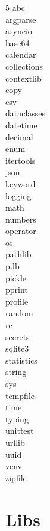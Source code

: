\documentclass [8pt] {extarticle}
\begin{document}
    \begin {multicols} {5}
    abc \\
    argparse \\
    asyncio \\
    base64 \\
    calendar \\
    collections \\
    contextlib \\
    copy \\
    csv \\
    dataclasses \\
    datetime \\
    decimal \\
    enum \\
    itertools \\
    json \\
    keyword \\
    logging \\
    math \\
    numbers \\
    operator \\
    os \\
    pathlib \\
    pdb \\
    pickle \\
    pprint \\
    profile \\
    random \\
    re \\
    secrets \\
    sqlite3 \\
    statistics \\
    string \\
    sys \\
    tempfile \\
    time \\
    typing \\
    unittest \\
    urllib \\
    uuid \\
    venv \\
    zipfile \\
    \end {multicols}

    \section {Libs}
\end{document}
